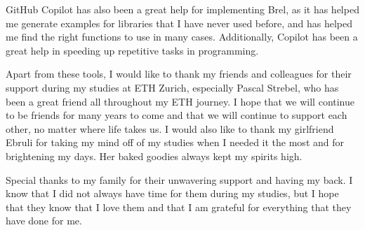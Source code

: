 GitHub Copilot has also been a great help for implementing Brel, 
as it has helped me generate examples for libraries that I have never used before,
and has helped me find the right functions to use in many cases.
Additionally, Copilot has been a great help in speeding up repetitive tasks in programming.

Apart from these tools, I would like to thank my friends and colleagues for their support during my studies at ETH Zurich,
especially Pascal Strebel, who has been a great friend all throughout my ETH journey.
I hope that we will continue to be friends for many years to come and that we will continue to support each other, no matter where life takes us.
I would also like to thank my girlfriend Ebruli for taking my mind off of my studies when I needed it the most and
for brightening my days. 
Her baked goodies always kept my spirits high.

Special thanks to my family for their unwavering support and having my back.
I know that I did not always have time for them during my studies, 
but I hope that they know that I love them and that I am grateful for everything that they have done for me.

